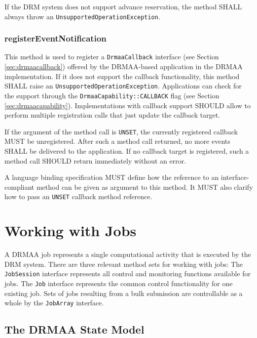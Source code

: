 \documentclass{article}
\newcommand{\h}[1]{\lstinline|#1|}
\newcommand{\langbind}[1]{\begin{shaded}#1\end{shaded}}
\newcommand{\rat}[1]{}
\begin{document}
If the DRM system does not support advance reservation, the method SHALL always throw an \h{UnsupportedOperationException}.

\rat{June 29th 2011 conf call decided to make the method names explicit enough to see the return type.}


\subsubsection{registerEventNotification}

This method is used to register a \h{DrmaaCallback} interface (see Section \ref{sec:drmaacallback}) offered by the DRMAA-based application in the DRMAA implementation. If it does not support the callback functionality, this method SHALL raise an \h{UnsupportedOperationException}. Applications can check for the support through the \h{DrmaaCapability::CALLBACK} flag (see Section \ref{sec:drmaacapability}). Implementations with callback support SHOULD allow to perform multiple registration calls that just update the callback target. 

If the argument of the method call is \h{UNSET}, the currently registered callback MUST be unregistered. After such a method call returned, no more events SHALL be delivered to the application. If no callback target is registered, such a method call SHOULD return immediately without an error. 

\langbind{
A language binding specification MUST define how the reference to an interface-compliant method can be given as argument to this method. It MUST also clarify how to pass an \h{UNSET} callback method reference.
}	

\section{Working with Jobs}

A DRMAA job represents a single computational activity that is executed by the DRM system. There are three relevant method sets for working with jobs: The \h{JobSession} interface represents all control and monitoring functions available for jobs. The \h{Job} interface represents the common control functionality for one existing job. Sets of jobs resulting from a bulk submission are controllable as a whole by the \h{JobArray} interface. 

\subsection{The DRMAA State Model}
\label{sec:jobstates}
\end{document}

